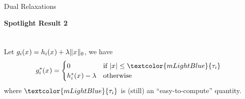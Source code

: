 \documentclass[10pt]{beamer}
\begin{document}
\begin{frame}{Dual Relaxations}
  \begin{center}
    \textbf{Spotlight Result 2} \\
    \\~\\
    Let $g_{i}(x_{}) = h_{i}(x_{}) + \lambda\|x_{}\|_0$, we have
    \begin{equation*}
      \conj{\separable{\rfunc}{\idxentry}}(\pvi{}) = 
      \begin{cases}
        0 &\text{if } \abs{\pvi{}} \leq \textcolor{mLightBlue}{\separable{\pertslope}{\idxentry}} \\
        \conj{\separable{\pfunc}{\idxentry}}(\pvi{}) - \reg &\text{otherwise}
      \end{cases}
    \end{equation*}
    where $\textcolor{mLightBlue}{\separable{\pertslope}{\idxentry}}$ is (still) an ``easy-to-compute'' quantity.
  \end{center}

\end{frame}
\end{document}
